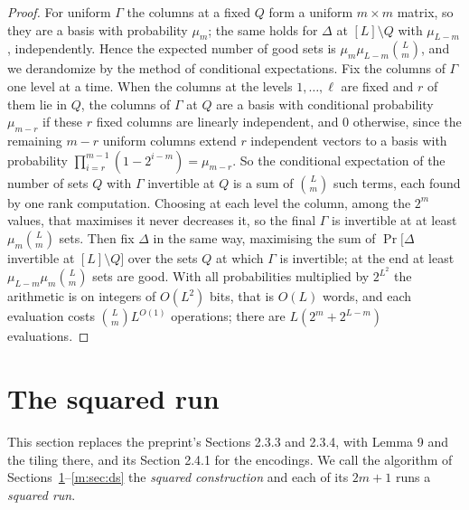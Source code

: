 \documentclass[11pt]{article}
\theoremstyle{definition}
\theoremstyle{remark}
\begin{document}
\begin{proof}
For uniform $\Gamma$ the columns at a fixed $Q$ form a uniform $m\times m$ matrix, so they are a basis with probability $\mu_m$; the same holds for $\Delta$ at $[L]\setminus Q$ with $\mu_{L-m}$, independently. Hence the expected number of good sets is $\mu_m\mu_{L-m}\binom Lm$, and we derandomize by the method of conditional expectations. Fix the columns of $\Gamma$ one level at a time. When the columns at the levels $1,\dots,\ell$ are fixed and $r$ of them lie in $Q$, the columns of $\Gamma$ at $Q$ are a basis with conditional probability $\mu_{m-r}$ if these $r$ fixed columns are linearly independent, and $0$ otherwise, since the remaining $m-r$ uniform columns extend $r$ independent vectors to a basis with probability $\prod_{i=r}^{m-1}(1-2^{i-m})=\mu_{m-r}$. So the conditional expectation of the number of sets $Q$ with $\Gamma$ invertible at $Q$ is a sum of $\binom Lm$ such terms, each found by one rank computation. Choosing at each level the column, among the $2^m$ values, that maximises it never decreases it, so the final $\Gamma$ is invertible at at least $\mu_m\binom Lm$ sets. Then fix $\Delta$ in the same way, maximising the sum of $\Pr[\Delta$ invertible at $[L]\setminus Q]$ over the sets $Q$ at which $\Gamma$ is invertible; at the end at least $\mu_{L-m}\mu_m\binom Lm$ sets are good. With all probabilities multiplied by $2^{L^2}$ the arithmetic is on integers of $O(L^2)$ bits, that is $O(L)$ words, and each evaluation costs $\binom Lm L^{O(1)}$ operations; there are $L(2^m+2^{L-m})$ evaluations.
\end{proof}

\section{The squared run}\label{m:sec:squared}

This section replaces the preprint's Sections 2.3.3 and 2.3.4, with Lemma 9 and the tiling there, and its Section 2.4.1 for the encodings. We call the algorithm of Sections~\ref{m:sec:squared}--\ref{m:sec:ds} the \emph{squared construction} and each of its $2m+1$ runs a \emph{squared run}.
\end{document}
